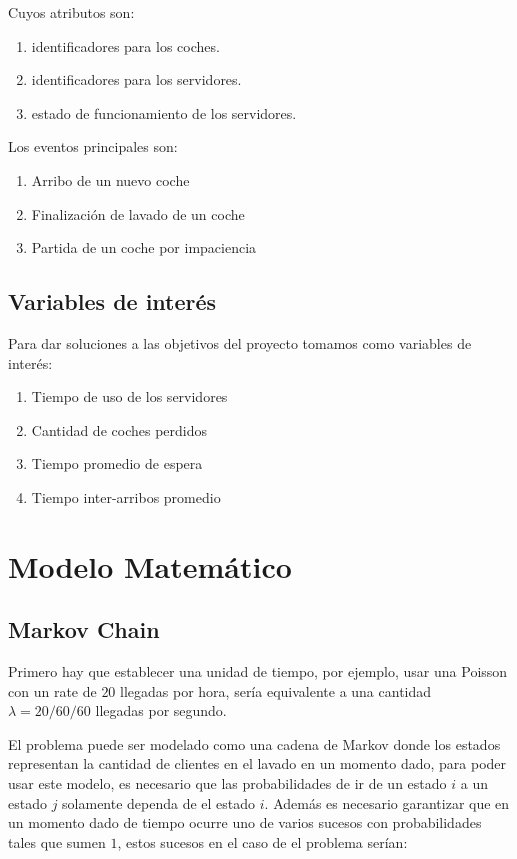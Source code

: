 \documentclass[14pt]{extarticle}
\begin{document}
Cuyos atributos son:

\begin{enumerate}
    \item identificadores para los coches.
    \item identificadores para los servidores.
    \item estado de funcionamiento de los servidores.
\end{enumerate}

Los eventos principales son:
\begin{enumerate}
    \item Arribo de un nuevo coche
    \item Finalización de lavado de un coche
    \item Partida de un coche por impaciencia     
\end{enumerate}

\subsection{Variables de interés}

Para dar soluciones a las objetivos del proyecto tomamos como variables de interés:
\begin{enumerate}

    \item  Tiempo de uso de los servidores
    \item  Cantidad de coches perdidos
    \item  Tiempo promedio de espera
    \item  Tiempo inter-arribos promedio
\end{enumerate}

\section{Modelo Matemático}

\subsection{Markov Chain}

Primero hay que establecer una unidad de tiempo, por ejemplo, usar una Poisson con un rate de $20$ llegadas por hora, sería equivalente a una cantidad $\lambda = 20 / 60 / 60$ llegadas por segundo. 

El problema puede ser modelado como una cadena de Markov donde los estados representan la cantidad de clientes en el lavado en un momento dado, para poder usar este modelo, es necesario que las probabilidades de ir de un estado $i$ a un estado $j$ solamente dependa de el estado $i$. Además es necesario garantizar que en un momento dado de tiempo ocurre uno de varios sucesos con probabilidades tales que sumen $1$, estos sucesos en el caso de el problema serían:
\end{document}
